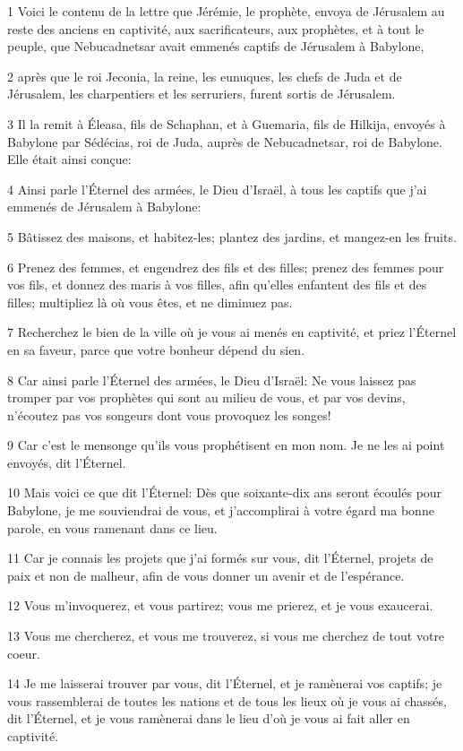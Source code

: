 \par 1 Voici le contenu de la lettre que Jérémie, le prophète, envoya de Jérusalem au reste des anciens en captivité, aux sacrificateurs, aux prophètes, et à tout le peuple, que Nebucadnetsar avait emmenés captifs de Jérusalem à Babylone,
\par 2 après que le roi Jeconia, la reine, les eunuques, les chefs de Juda et de Jérusalem, les charpentiers et les serruriers, furent sortis de Jérusalem.
\par 3 Il la remit à Éleasa, fils de Schaphan, et à Guemaria, fils de Hilkija, envoyés à Babylone par Sédécias, roi de Juda, auprès de Nebucadnetsar, roi de Babylone. Elle était ainsi conçue:
\par 4 Ainsi parle l'Éternel des armées, le Dieu d'Israël, à tous les captifs que j'ai emmenés de Jérusalem à Babylone:
\par 5 Bâtissez des maisons, et habitez-les; plantez des jardins, et mangez-en les fruits.
\par 6 Prenez des femmes, et engendrez des fils et des filles; prenez des femmes pour vos fils, et donnez des maris à vos filles, afin qu'elles enfantent des fils et des filles; multipliez là où vous êtes, et ne diminuez pas.
\par 7 Recherchez le bien de la ville où je vous ai menés en captivité, et priez l'Éternel en sa faveur, parce que votre bonheur dépend du sien.
\par 8 Car ainsi parle l'Éternel des armées, le Dieu d'Israël: Ne vous laissez pas tromper par vos prophètes qui sont au milieu de vous, et par vos devins, n'écoutez pas vos songeurs dont vous provoquez les songes!
\par 9 Car c'est le mensonge qu'ils vous prophétisent en mon nom. Je ne les ai point envoyés, dit l'Éternel.
\par 10 Mais voici ce que dit l'Éternel: Dès que soixante-dix ans seront écoulés pour Babylone, je me souviendrai de vous, et j'accomplirai à votre égard ma bonne parole, en vous ramenant dans ce lieu.
\par 11 Car je connais les projets que j'ai formés sur vous, dit l'Éternel, projets de paix et non de malheur, afin de vous donner un avenir et de l'espérance.
\par 12 Vous m'invoquerez, et vous partirez; vous me prierez, et je vous exaucerai.
\par 13 Vous me chercherez, et vous me trouverez, si vous me cherchez de tout votre coeur.
\par 14 Je me laisserai trouver par vous, dit l'Éternel, et je ramènerai vos captifs; je vous rassemblerai de toutes les nations et de tous les lieux où je vous ai chassés, dit l'Éternel, et je vous ramènerai dans le lieu d'où je vous ai fait aller en captivité.
